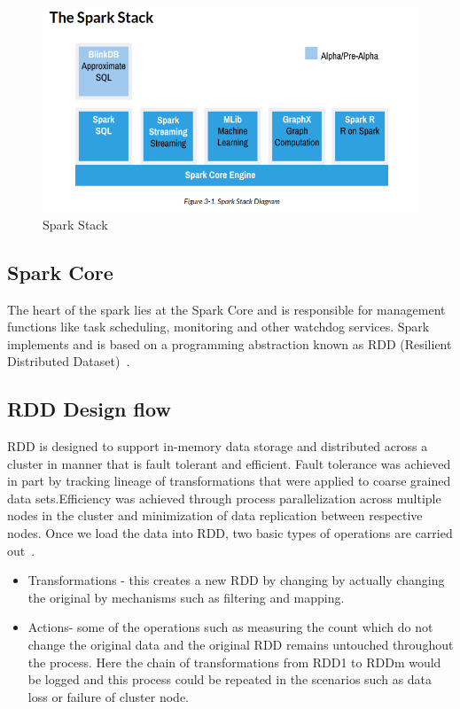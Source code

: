 \begin{figure}[!ht]
  \centering\includegraphics[width=\columnwidth]{images/spark-stack.png}
   \caption{Spark Stack 
   ~\cite{hid-sp18-410-spark-architecture}}\label{fig:spark-stack}
\end{figure}


\subsection{Spark Core}

The heart of the spark lies at the Spark Core and is responsible for management 
functions like task scheduling, monitoring and other watchdog services. 
Spark implements and is based on a programming abstraction known as 
RDD (Resilient Distributed Dataset)~\cite{hid-sp18-410-spark-architecture}.



\subsection{RDD Design flow}

RDD is designed to support in-memory data storage and distributed across a 
cluster in manner that is   fault tolerant and efficient. Fault tolerance was 
achieved in part by tracking lineage of transformations that were applied to 
coarse grained data sets.Efficiency was achieved through process parallelization
 across multiple nodes in the cluster and minimization of data replication 
 between respective nodes.
Once we load the data into RDD, two basic types of operations 
are carried out~\cite{hid-sp18-410-spark-RDD}.

\begin{itemize}

\item Transformations - this creates a new RDD by changing by actually changing 
the original by mechanisms such as filtering and mapping.

\item Actions- some of the operations such as measuring the count which do not 
change the original data and the original RDD remains untouched throughout the 
process. Here the chain of transformations from RDD1 to RDDm would be logged and
this process could be repeated in the scenarios such as data loss or failure of 
cluster node.

\end{itemize}

